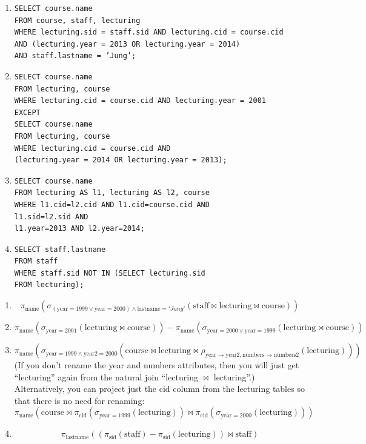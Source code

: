 \begin{enumerate}
    \item[a.] 
\begin{verbatim}
SELECT course.name
FROM course, staff, lecturing
WHERE lecturing.sid = staff.sid AND lecturing.cid = course.cid
AND (lecturing.year = 2013 OR lecturing.year = 2014)
AND staff.lastname = ’Jung’;
\end{verbatim}

    \item[b.] 
\begin{verbatim}
SELECT course.name
FROM lecturing, course
WHERE lecturing.cid = course.cid AND lecturing.year = 2001
EXCEPT
SELECT course.name
FROM lecturing, course
WHERE lecturing.cid = course.cid AND
(lecturing.year = 2014 OR lecturing.year = 2013);
\end{verbatim}

    \item[c.] 
\begin{verbatim}
SELECT course.name
FROM lecturing AS l1, lecturing AS l2, course
WHERE l1.cid=l2.cid AND l1.cid=course.cid AND
l1.sid=l2.sid AND
l1.year=2013 AND l2.year=2014;
\end{verbatim}

    \item[d.] 
\begin{verbatim}
SELECT staff.lastname
FROM staff
WHERE staff.sid NOT IN (SELECT lecturing.sid
FROM lecturing);
\end{verbatim}
\end{enumerate}

\begin{enumerate}
    \item[a.] \[
    \pi_{\text{name}}(\sigma_{(\text{year}=1999 \vee \text{year}=2000) \wedge \text{lastname}='Jung'}(\text{staff} \bowtie \text{lecturing} \bowtie \text{course}))
    \]

    \item[b.] \[
    \pi_{\text{name}}(\sigma_{\text{year}=2001}(\text{lecturing} \bowtie \text{course})) - \pi_{\text{name}}(\sigma_{\text{year}=2000 \vee \text{year}=1999}(\text{lecturing} \bowtie \text{course}))
    \]

    \item[c.] \[
    \pi_{\text{name}}(\sigma_{\text{year}=1999 \wedge \text{year2}=2000}(\text{course} \bowtie \text{lecturing} \bowtie \rho_{\text{year} \rightarrow \text{year2}, \text{numbers} \rightarrow \text{numbers2}}(\text{lecturing})))
    \]
    (If you don’t rename the year and numbers attributes, then you will just get “lecturing” again from
the natural join “lecturing $\bowtie$ lecturing”.) \\
Alternatively, you can project just the cid column from the lecturing tables so that there is no need for
renaming: 
    \[
    \pi_{\text{name}}(\text{course} \bowtie \pi_{\text{cid}}(\sigma_{\text{year}=1999}(\text{lecturing})) \bowtie \pi_{\text{cid}}(\sigma_{\text{year}=2000}(\text{lecturing})))
    \]

    \item[d.] \[
    \pi_{\text{lastname}}((\pi_{\text{sid}}(\text{staff}) - \pi_{\text{sid}}(\text{lecturing})) \bowtie \text{staff})
    \]
\end{enumerate}
